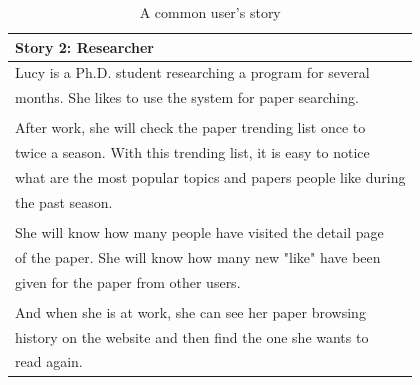 \documentclass[sigconf, nonacm]{../tex_template/acmart}
\begin{document}
\begin{table}[h!]
	\begin{tabular}{ l }
		\hline
		\textbf{Story 2: Researcher}                                   \\
		\hline
		Lucy is a Ph.D. student researching a program for several      \\
		months. She likes to use the system for paper searching.       \\
		\\
		After work, she will check the paper trending list once to     \\
		twice a season. With this trending list, it is easy to notice  \\
		what are the most popular topics and papers people like during \\
		the past season.                                               \\
		\\
		She will know how many people have visited the detail page     \\
		of the paper. She will know how many new "like" have been      \\
		given for the paper from other users.                          \\
		\\
		And when she is at work, she can see her paper browsing        \\
		history on the website and then find the one she wants to      \\
		read again.                                                    \\
		\hline
	\end{tabular}
	\caption{A common user's story}
	\label{table:2}
\end{table}
\end{document}
